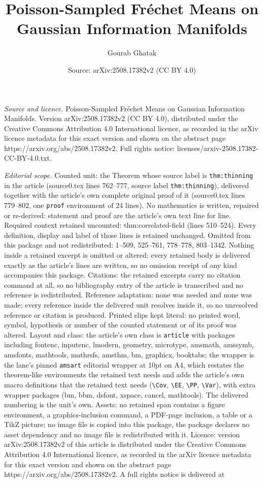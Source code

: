 \documentclass[10pt,a4paper]{amsart}
\title[Poisson-Sampled Fr\'echet Means on Gaussian Information Mani]{Poisson-Sampled Fr\'echet Means on Gaussian Information Manifolds}
\author{Gourab Ghatak}
\date{Source: arXiv:2508.17382v2 (CC BY 4.0)}
\begin{document}
\maketitle

\noindent\emph{Source and licence.} Poisson-Sampled Fr\'echet Means on Gaussian Information Manifolds. Version arXiv:2508.17382v2 (CC BY 4.0), distributed under the Creative Commons Attribution 4.0 International licence, as recorded in the arXiv licence metadata for this exact version and shown on the abstract page https://arxiv.org/abs/2508.17382v2. Full rights notice: licenses/arxiv-2508.17382-CC-BY-4.0.txt.\par\smallskip

\noindent\textit{Editorial scope.} Counted unit: the Theorem whose source label is \texttt{thm:thinning} in the article (source0.tex lines 762--777, source label \texttt{thm:thinning}), delivered together with the article's own complete original proof of it (source0.tex lines 779--802, one \texttt{proof} environment of 24 lines). No mathematics is written, repaired or re-derived: statement and proof are the article's own text line for line. Required context retained uncounted: thm:correlated-field (lines 510--524). Every definition, display and label of those lines is retained unchanged. Omitted from this package and not redistributed: 1--509, 525--761, 778--778, 803--1342. Nothing inside a retained excerpt is omitted or altered: every retained body is delivered exactly as the article's lines are written, so no omission receipt of any kind accompanies this package. Citations: the retained excerpts carry no citation command at all, so no bibliography entry of the article is transcribed and no reference is redistributed. Reference adaptation: none was needed and none was made; every reference inside the delivered unit resolves inside it, so no unresolved reference or citation is produced. Printed slips kept literal: no printed word, symbol, hypothesis or number of the counted statement or of its proof was altered. Layout and class: the article's own class is \texttt{article} with packages including fontenc, inputenc, lmodern, geometry, microtype, amsmath, amssymb, amsfonts, mathtools, mathrsfs, amsthm, bm, graphicx, booktabs; the wrapper is the lane's pinned \texttt{amsart} editorial wrapper at 10pt on A4, which restates the theorem-like environments the retained text needs and adds the article's own macro definitions that the retained text needs (\texttt{\textbackslash Cov}, \texttt{\textbackslash EE}, \texttt{\textbackslash PP}, \texttt{\textbackslash Var}), with extra wrapper packages (bm, bbm, dsfont, xspace, cancel, mathtools). The delivered numbering is the unit's own. Assets: no retained span contains a figure environment, a graphics-inclusion command, a PDF-page inclusion, a table or a TikZ picture; no image file is copied into this package, the package declares no asset dependency and no image file is redistributed with it. Licence: version arXiv:2508.17382v2 of this article is distributed under the Creative Commons Attribution 4.0 International licence, as recorded in the arXiv licence metadata for this exact version and shown on the abstract page https://arxiv.org/abs/2508.17382v2. A full rights notice is delivered at 
\end{document}
